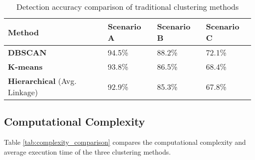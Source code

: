 \begin{table}[htbp]
    \centering
    \caption{Detection accuracy comparison of traditional clustering methods}
    \label{tab:accuracy_comparison}
    \begin{tcolorbox}[enhanced, colback=white, colframe=blue!75!black, 
                      title={\textbf{Detection Accuracy Analysis}},
                      fonttitle=\bfseries, 
                      width=0.9\linewidth,
                      drop shadow southeast]
    \begin{tabular}{l>{\centering\arraybackslash}p{2.7cm}>{\centering\arraybackslash}p{2.7cm}>{\centering\arraybackslash}p{2.7cm}}
        \toprule
        \rowcolor{blue!20}
        \textbf{Method} & \textbf{Scenario A} & \textbf{Scenario B} & \textbf{Scenario C} \\
        \midrule
        \textbf{DBSCAN} & \cellcolor{green!10}94.5\% & \cellcolor{yellow!10}88.2\% & \cellcolor{red!10}72.1\% \\
        \textbf{K-means} & \cellcolor{green!10}93.8\% & \cellcolor{yellow!10}86.5\% & \cellcolor{red!10}68.4\% \\
        \textbf{Hierarchical} (Avg. Linkage) & \cellcolor{green!10}92.9\% & \cellcolor{yellow!10}85.3\% & \cellcolor{red!10}67.8\% \\
        \bottomrule
    \end{tabular}
    \end{tcolorbox}
\end{table}

\subsection{Computational Complexity}

Table \ref{tab:complexity_comparison} compares the computational complexity and average execution time of the three clustering methods.

